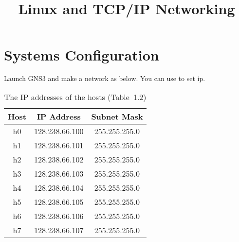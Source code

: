 \documentclass{../UTNetLab}
\title{Linux and TCP/IP Networking}
\begin{document}
\section*{Systems Configuration}
    Launch GNS3 and make a network as below.
    You can use  to set ip.
    \begin{center}
        \begin{minipage}{0.48\textwidth}
            \begin{flushleft}
                \begin{table}[H]
                    \caption{The IP addresses of the hosts (Table~1.2)}
                    \centering
                    \begin{tabular}{ c c c }
                        \hline \hline
                        Host & IP Address & Subnet Mask \\
                        \hline 
                        h0 & 128.238.66.100 & 255.255.255.0 \\
                        h1 & 128.238.66.101 & 255.255.255.0 \\
                        h2 & 128.238.66.102 & 255.255.255.0 \\
                        h3 & 128.238.66.103 & 255.255.255.0 \\
                        h4 & 128.238.66.104 & 255.255.255.0 \\
                        h5 & 128.238.66.105 & 255.255.255.0 \\
                        h6 & 128.238.66.106 & 255.255.255.0 \\
                        h7 & 128.238.66.107 & 255.255.255.0 \\
                        \hline \hline
                        \end{tabular}
                \end{table}
            \end{flushleft}
        \end{minipage}
        \begin{minipage}{0.48\textwidth}
            \begin{flushright}
                \begin{figure}[H]
                    \centering
\end{figure}
\end{flushright}
\end{minipage}
\end{center}
\end{document}
